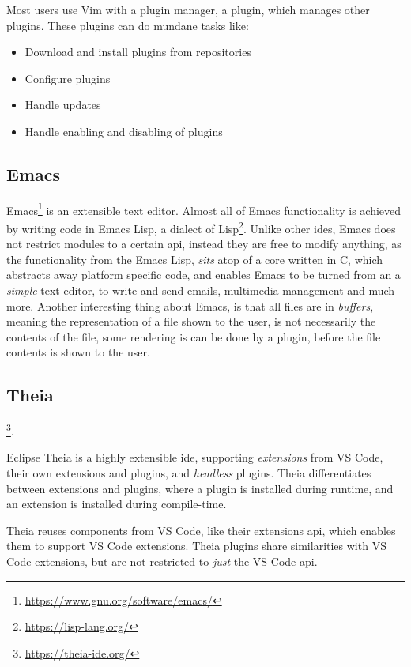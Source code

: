 Most users use Vim with a plugin manager, a plugin, which manages other plugins.
These plugins can do mundane tasks like:

\begin{itemize}
  \item Download and install plugins from repositories
  \item Configure plugins
  \item Handle updates
  \item Handle enabling and disabling of plugins
\end{itemize}

\subsection{Emacs}

Emacs\footnote{\url{https://www.gnu.org/software/emacs/}} is an extensible text
editor. Almost all of Emacs functionality is achieved by writing code in Emacs
Lisp, a dialect of Lisp\footnote{\url{https://lisp-lang.org/}}. Unlike other
\gls*{ide}s, Emacs does not restrict modules to a certain \gls*{api}, instead
they are free to modify anything, as the functionality from the Emacs Lisp,
\textit{sits} atop of a core written in C, which abstracts away platform
specific code, and enables Emacs to be turned from an a \textit{simple} text
editor, to write and send emails, multimedia management and much more. Another
interesting thing about Emacs, is that all files are in \textit{buffers},
meaning the representation of a file shown to the user, is not necessarily the
contents of the file, some rendering is can be done by a plugin, before the file
contents is shown to the user.


\subsection{Theia}

\footnote{\url{https://theia-ide.org/}}.

Eclipse Theia is a highly extensible \gls*{ide}, supporting \textit{extensions}
from VS Code, their own extensions and plugins, and \textit{headless} plugins.
Theia differentiates between extensions and plugins, where a plugin is installed
during runtime, and an extension is installed during compile-time.

Theia reuses components from VS Code, like their extensions \gls*{api}, which
enables them to support VS Code extensions. Theia plugins share similarities
with VS Code extensions, but are not restricted to \textit{just} the VS Code
\gls*{api}.

